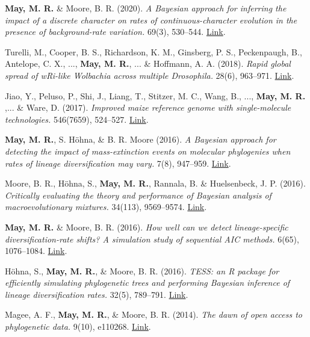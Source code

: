 \begin{etaremune}[topsep=0pt,itemsep=1.0em,partopsep=0pt,parsep=0pt]
    \item \textbf{May, M. R.} \& Moore, B. R. (2020). \textit{A Bayesian approach for inferring the impact of a discrete character on rates of continuous-character evolution in the presence of background-rate variation.}  69(3), 530–544. \href{https://doi.org/10.1093/sysbio/syz069}{Link}.
    \item Turelli, M., Cooper, B. S., Richardson, K. M., Ginsberg, P. S., Peckenpaugh, B., Antelope, C. X., ..., \textbf{May, M. R.}, ... \& Hoffmann, A. A. (2018). \textit{Rapid global spread of wRi-like Wolbachia across multiple Drosophila.}  28(6), 963–971. \href{https://linkinghub.elsevier.com/retrieve/pii/S0960982218301696}{Link}.
    \item Jiao, Y., Peluso, P., Shi, J., Liang, T., Stitzer, M. C., Wang, B., ..., \textbf{May, M. R.} ,... \& Ware, D. (2017). \textit{Improved maize reference genome with single-molecule technologies.}  546(7659), 524–527. \href{https://www.nature.com/articles/nature22971}{Link}.
    \item \textbf{May, M. R.}, S. Höhna, \& B. R. Moore (2016). \textit{A Bayesian approach for detecting the impact of mass-extinction events on molecular phylogenies when rates of lineage diversification may vary.}  7(8), 947–959. \href{https://doi.org/10.1111/2041-210X.12563}{Link}.
    \item Moore, B. R., Höhna, S., \textbf{May, M. R.}, Rannala, B. \& Huelsenbeck, J. P. (2016). \textit{Critically evaluating the theory and performance of Bayesian analysis of macroevolutionary mixtures.}  34(113), 9569–9574. \href{https://doi.org/10.1073/pnas.1518659113}{Link}.
    \item \textbf{May, M. R.} \& Moore, B. R. (2016). \textit{How well can we detect lineage-specific diversification-rate shifts? A simulation study of sequential AIC methods.}  6(65), 1076–1084. \href{https://doi.org/10.1093/sysbio/syw026}{Link}.
    \item Höhna, S., \textbf{May, M. R.}, \& Moore, B. R. (2016). \textit{TESS: an R package for efficiently simulating phylogenetic trees and performing Bayesian inference of lineage diversification rates.}  32(5), 789–791. \href{https://doi.org/10.1093/bioinformatics/btv651}{Link}.
    \item Magee, A. F., \textbf{May, M. R.}, \& Moore, B. R. (2014). \textit{The dawn of open access to phylogenetic data.}  9(10), e110268. \href{https://journals.plos.org/plosone/article?id=10.1371/journal.pone.0110268}{Link}.

\end{etaremune}
